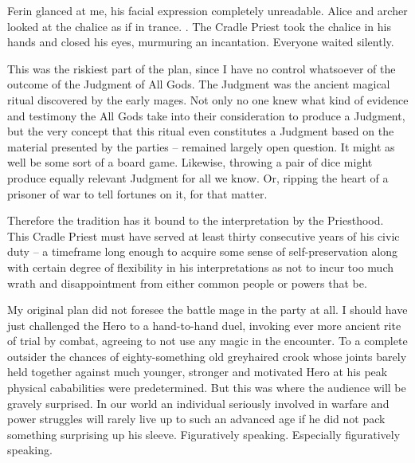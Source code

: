
 Ferin glanced at me, his facial expression completely unreadable.  Alice and archer looked at the chalice as if in trance. . The Cradle Priest took the chalice in his hands and closed his eyes, murmuring an incantation. Everyone waited silently.

This was the riskiest part of the plan, since I have no control whatsoever of the outcome of the Judgment of All Gods. The Judgment was the ancient magical ritual discovered by the early mages. Not only no one knew what kind of evidence and testimony the All Gods take into their consideration to produce a Judgment, but the very concept that this ritual even constitutes a Judgment based on the material presented by the parties -- remained largely open question. It might as well be some sort of a board game. Likewise, throwing a pair of dice might produce equally relevant Judgment for all we know. Or, ripping the heart of a prisoner of war to tell fortunes on it, for that matter.

Therefore the tradition has it bound to the interpretation by the Priesthood. This Cradle Priest must have served at least thirty consecutive years of his civic duty -- a timeframe long enough to acquire some sense of self-preservation along with certain degree of flexibility in his interpretations as not to incur too much wrath and disappointment from either common people or powers that be.

My original plan did not foresee the battle mage in the party at all. I should have just challenged the Hero to a hand-to-hand duel, invoking ever more ancient rite of trial by combat, agreeing to not use any magic in the encounter. To a complete outsider the chances of eighty-something old greyhaired crook whose joints barely held together against much younger, stronger and motivated Hero at his peak physical cababilities were predetermined. But this was where the audience will be gravely surprised. In our world an individual seriously involved in warfare and power struggles will rarely live up to such an advanced age if he did not pack something surprising up his sleeve. Figuratively speaking. Especially figuratively speaking.

